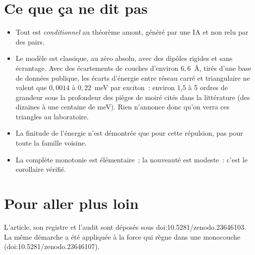 \section*{Ce que ça ne dit pas}

\begin{limite}
\begin{itemize}
\item Tout est \emph{conditionnel} au théorème amont, généré par une IA et non relu par des pairs.
\item Le modèle est classique, au zéro absolu, avec des dipôles rigides et sans écrantage. Avec des écartements de
  couches d'environ $6{,}6$~Å, tirés d'une base de données publique, les écarts d'énergie entre réseau carré et
  triangulaire ne valent que $0{,}0014$ à $0{,}22$~meV par exciton~: environ 1,5 à 5 ordres de grandeur sous la
  profondeur des pièges de moiré cités dans la littérature (des dizaines à une centaine de meV). Rien n'annonce donc qu'on verra ces
  triangles au laboratoire.
\item La finitude de l'énergie n'est démontrée que pour cette répulsion, pas pour toute la famille voisine.
\item La complète monotonie est élémentaire~; la nouveauté est modeste~: c'est le corollaire vérifié.
\end{itemize}
\end{limite}

\section*{Pour aller plus loin}

L'article, son registre et l'audit sont déposés sous doi:10.5281/\allowbreak zenodo.23646103. La même démarche a été appliquée
à la force qui règne dans une monocouche (doi:10.5281/zenodo.23646107).
